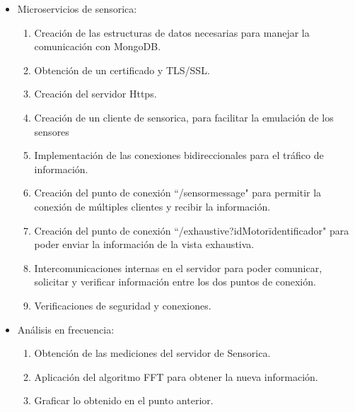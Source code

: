 \begin{itemize}
    \item Microservicios de sensorica:
        \begin{enumerate}
            \item Creación de las estructuras de datos necesarias para manejar
                la comunicación con MongoDB.
            \item Obtención de un certificado y TLS/SSL.
            \item Creación del servidor Https.
            \item Creación de un cliente de sensorica, para facilitar la emulación
                de los sensores
            \item Implementación de las conexiones bidireccionales para el tráfico
                de información.
            \item Creación del punto de conexión ``/sensormessage" para permitir
                la conexión de múltiples clientes y recibir la información.
            \item Creación del punto de conexión ``/exhaustive?idMotor\=identificador"
                para poder enviar la información de la vista exhaustiva.
            \item Intercomunicaciones internas en el servidor para poder comunicar,
                solicitar y verificar información entre los dos puntos de conexión.
            \item Verificaciones de seguridad y conexiones.
        \end{enumerate}

    \item Análisis en frecuencia:
        \begin{enumerate}
                \item Obtención de las mediciones del servidor de Sensorica.
                \item Aplicación del algoritmo FFT para obtener la nueva
                    información.
                \item Graficar lo obtenido en el punto anterior.
        \end{enumerate}


\end{itemize}
